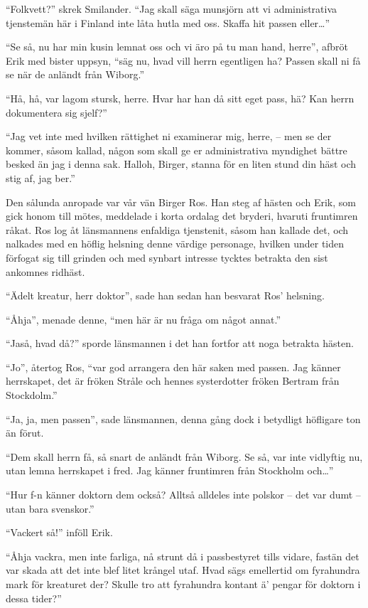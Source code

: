 ``Folkvett?'' skrek Smilander. ``Jag skall säga munsjörn att vi
administrativa tjenstemän här i Finland inte låta hutla med oss. Skaffa
hit passen eller\ldots{}''

``Se så, nu har min kusin lemnat oss och vi äro på tu man hand, herre'',
afbröt Erik med bister uppsyn, ``säg nu, hvad vill herrn egentligen ha?
Passen skall ni få se när de anländt från Wiborg.''

``Hå, hå, var lagom stursk, herre. Hvar har han då sitt eget pass, hä?
Kan herrn dokumentera sig sjelf?''

``Jag vet inte med hvilken rättighet ni examinerar mig, herre, -- men se
der kommer, såsom kallad, någon som skall ge er administrativa myndighet
bättre besked än jag i denna sak. Halloh, Birger, stanna för en liten
stund din häst och stig af, jag ber.''

Den sålunda anropade var vår vän Birger Ros. Han steg af hästen och
Erik, som gick honom till mötes, meddelade i korta ordalag det bryderi,
hvaruti fruntimren råkat. Ros log åt länsmannens enfaldiga tjenstenit,
såsom han kallade det, och nalkades med en höflig helsning denne värdige
personage, hvilken under tiden förfogat sig till grinden och med synbart
intresse tycktes betrakta den sist ankomnes ridhäst.

``Ädelt kreatur, herr doktor'', sade han sedan han besvarat Ros'
helsning.

``Åhja'', menade denne, ``men här är nu fråga om något annat.''

``Jaså, hvad då?'' sporde länsmannen i det han fortfor att noga betrakta
hästen.

``Jo'', återtog Ros, ``var god arrangera den här saken med passen. Jag
känner herrskapet, det är fröken Stråle och hennes systerdotter fröken
Bertram från Stockdolm.''

``Ja, ja, men passen'', sade länsmannen, denna gång dock i betydligt
höfligare ton än förut.

``Dem skall herrn få, så snart de anländt från Wiborg. Se så, var inte
vidlyftig nu, utan lemna herrskapet i fred. Jag känner fruntimren från
Stockholm och\ldots{}''

``Hur f-n känner doktorn dem också? Alltså alldeles inte polskor -- det
var dumt -- utan bara svenskor.''

``Vackert så!'' inföll Erik.

``Åhja vackra, men inte farliga, nå strunt då i passbestyret tills
vidare, fastän det var skada att det inte blef litet krångel utaf. Hvad
sägs emellertid om fyrahundra mark för kreaturet der? Skulle tro att
fyrahundra kontant ä' pengar för doktorn i dessa tider?''

